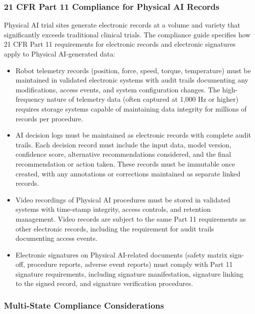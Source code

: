 \subsubsection{21 CFR Part 11 Compliance for Physical AI Records}

Physical AI trial sites generate electronic records at a volume and variety
that significantly exceeds traditional clinical trials. The compliance guide
specifies how 21 CFR Part 11 requirements for electronic records and
electronic signatures apply to Physical AI-generated data:

\begin{itemize}
    \item Robot telemetry records (position, force, speed, torque, temperature)
    must be maintained in validated electronic systems with audit trails
    documenting any modifications, access events, and system configuration
    changes. The high-frequency nature of telemetry data (often captured at
    1,000 Hz or higher) requires storage systems capable of maintaining data
    integrity for millions of records per procedure.

    \item AI decision logs must be maintained as electronic records with
    complete audit trails. Each decision record must include the input data,
    model version, confidence score, alternative recommendations considered,
    and the final recommendation or action taken. These records must be
    immutable once created, with any annotations or corrections maintained
    as separate linked records.

    \item Video recordings of Physical AI procedures must be stored in
    validated systems with time-stamp integrity, access controls, and
    retention management. Video records are subject to the same Part 11
    requirements as other electronic records, including the requirement for
    audit trails documenting access events.

    \item Electronic signatures on Physical AI-related documents (safety
    matrix sign-off, procedure reports, adverse event reports) must comply
    with Part 11 signature requirements, including signature manifestation,
    signature linking to the signed record, and signature verification
    procedures.
\end{itemize}

\subsubsection{Multi-State Compliance Considerations}


